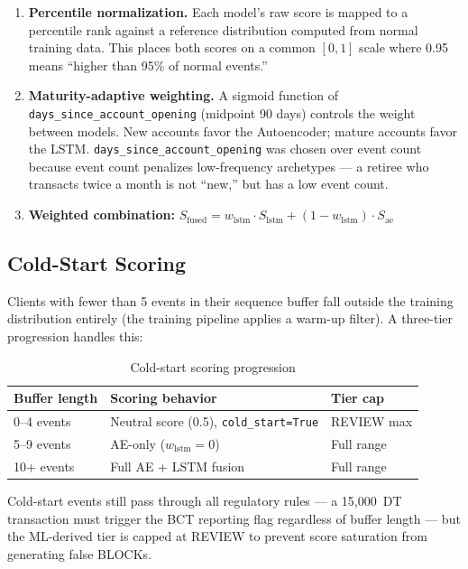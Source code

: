 \begin{enumerate}[leftmargin=2cm]
    \item \textbf{Percentile normalization.} Each model's raw score is mapped to a
          percentile rank against a reference distribution computed from normal
          training data. This places both scores on a common $[0, 1]$ scale where
          0.95 means ``higher than 95\% of normal events.''

    \item \textbf{Maturity-adaptive weighting.} A sigmoid function of
          \texttt{days\_since\_account\_opening} (midpoint 90 days) controls the
          weight between models. New accounts favor the Autoencoder; mature accounts
          favor the LSTM. \texttt{days\_since\_account\_opening} was chosen over event
          count because event count penalizes low-frequency archetypes --- a retiree
          who transacts twice a month is not ``new,'' but has a low event count.

    \item \textbf{Weighted combination:}
          $S_{\text{fused}} = w_{\text{lstm}} \cdot S_{\text{lstm}} + (1 - w_{\text{lstm}}) \cdot S_{\text{ae}}$
\end{enumerate}

\subsection{Cold-Start Scoring}

Clients with fewer than 5 events in their sequence buffer fall outside the training
distribution entirely (the training pipeline applies a warm-up filter). A three-tier
progression handles this:

\begin{table}[H]
\centering
\caption{Cold-start scoring progression}
\label{tab:cold-start}
\begin{tabular}{@{}lll@{}}
\toprule
\textbf{Buffer length} & \textbf{Scoring behavior} & \textbf{Tier cap} \\
\midrule
0--4 events   & Neutral score (0.5), \texttt{cold\_start=True} & REVIEW max \\
5--9 events   & AE-only ($w_{\text{lstm}} = 0$) & Full range \\
10+ events    & Full AE + LSTM fusion & Full range \\
\bottomrule
\end{tabular}
\end{table}

Cold-start events still pass through all regulatory rules --- a 15,000~DT transaction
must trigger the BCT reporting flag regardless of buffer length --- but the ML-derived
tier is capped at REVIEW to prevent score saturation from generating false BLOCKs.

